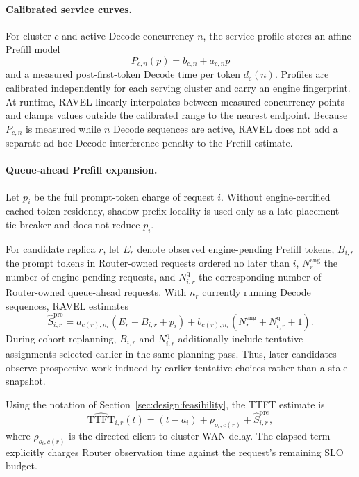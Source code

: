 \paragraph{Calibrated service curves.}
For cluster $c$ and active Decode concurrency $n$, the service profile stores
an affine Prefill model
\begin{equation}
    P_{c,n}(p)=b_{c,n}+a_{c,n}p
    \label{eq:appendix:prefill-profile}
\end{equation}
and a measured post-first-token Decode time per token $d_c(n)$.
Profiles are calibrated independently for each serving cluster and carry an
engine fingerprint.
At runtime, RAVEL linearly interpolates between measured concurrency points
and clamps values outside the calibrated range to the nearest endpoint.
Because $P_{c,n}$ is measured while $n$ Decode sequences are active, RAVEL
does not add a separate ad-hoc Decode-interference penalty to the Prefill
estimate.

\paragraph{Queue-ahead Prefill expansion.}
Let $p_i$ be the full prompt-token charge of request $i$.
Without engine-certified cached-token residency, shadow prefix locality is used
only as a late placement tie-breaker and does not reduce $p_i$.

For candidate replica $r$, let $E_r$ denote observed engine-pending Prefill
tokens, $B_{i,r}$ the prompt tokens in Router-owned requests ordered no later
than $i$, $N_r^{\mathrm{eng}}$ the number of engine-pending requests, and
$N_{i,r}^{\mathrm{q}}$ the corresponding number of Router-owned queue-ahead
requests.
With $n_r$ currently running Decode sequences, RAVEL estimates
\begin{equation}
    \widehat{S}^{\mathrm{pre}}_{i,r}
    =
    a_{c(r),n_r}
    \left(E_r+B_{i,r}+p_i\right)
    +
    b_{c(r),n_r}
    \left(N_r^{\mathrm{eng}}+N_{i,r}^{\mathrm{q}}+1\right).
    \label{eq:appendix:prefill-service}
\end{equation}
During cohort replanning, $B_{i,r}$ and $N_{i,r}^{\mathrm{q}}$ additionally
include tentative assignments selected earlier in the same planning pass.
Thus, later candidates observe prospective work induced by earlier tentative
choices rather than a stale snapshot.

Using the notation of Section~\ref{sec:design:feasibility}, the TTFT estimate
is
\begin{equation}
    \widehat{\mathrm{TTFT}}_{i,r}(t)
    =
    (t-a_i)
    +
    \rho_{o_i,c(r)}
    +
    \widehat{S}^{\mathrm{pre}}_{i,r},
    \label{eq:appendix:ttft}
\end{equation}
where $\rho_{o_i,c(r)}$ is the directed client-to-cluster WAN delay.
The elapsed term explicitly charges Router observation time against the
request's remaining SLO budget.

